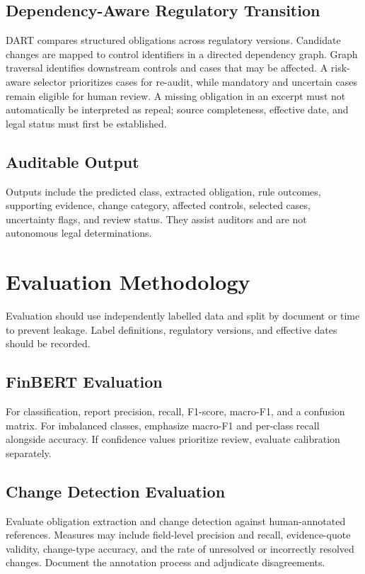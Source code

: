 \documentclass[conference]{IEEEtran}
\begin{document}
\subsection{Dependency-Aware Regulatory Transition}
DART compares structured obligations across regulatory versions. Candidate changes are mapped to control identifiers in a directed dependency graph. Graph traversal identifies downstream controls and cases that may be affected. A risk-aware selector prioritizes cases for re-audit, while mandatory and uncertain cases remain eligible for human review. A missing obligation in an excerpt must not automatically be interpreted as repeal; source completeness, effective date, and legal status must first be established.

\subsection{Auditable Output}
Outputs include the predicted class, extracted obligation, rule outcomes, supporting evidence, change category, affected controls, selected cases, uncertainty flags, and review status. They assist auditors and are not autonomous legal determinations.

\section{Evaluation Methodology}
Evaluation should use independently labelled data and split by document or time to prevent leakage. Label definitions, regulatory versions, and effective dates should be recorded.

\subsection{FinBERT Evaluation}
For classification, report precision, recall, F1-score, macro-F1, and a confusion matrix. For imbalanced classes, emphasize macro-F1 and per-class recall alongside accuracy. If confidence values prioritize review, evaluate calibration separately.

\subsection{Change Detection Evaluation}
Evaluate obligation extraction and change detection against human-annotated references. Measures may include field-level precision and recall, evidence-quote validity, change-type accuracy, and the rate of unresolved or incorrectly resolved changes. Document the annotation process and adjudicate disagreements.
\end{document}
